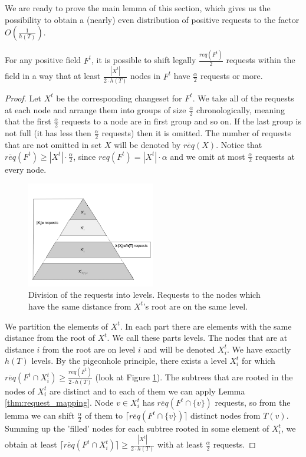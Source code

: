 We are ready to prove the main lemma of this
section, which gives us the possibility to obtain a (nearly) even distribution of
positive requests to the factor $O(\frac{1}{h(T)})$. 
\begin{lemma} For any positive field $F^t$, it is possible to shift legally $\frac{req(F^t)}{2}$
requests within the field in a way that at least $\frac{|X^t|}{2 \cdot h(T)}$ nodes in
$F^t$ have $\frac{\alpha}{2}$ requests or more.
\label{thm:legal_shifting_down}
\end{lemma}
\begin{proof}
Let $X^t$ be the corresponding changeset for $F^t$. We
take all of the requests at each node and arrange them into groups of size
$\frac{\alpha}{2}$ chronologically, meaning that the first $\frac{\alpha}{2}$
requests to a node are in first group and so on. If the last group is not full
(it has less then $\frac{\alpha}{2}$ requests) then it is omitted. The number
of requests that are not omitted in set $X$ will be denoted by
$\overline{req}(X)$. Notice that  $\overline{req}(F^t) \geq |X^t| \cdot
\frac{\alpha}{2}$, since $req(F^t) = |X^t| \cdot \alpha$ and we omit at most
$\frac{\alpha}{2}$ requests at every node.  \begin{figure} \begin{center}
\includegraphics[width=0.5\textwidth]{layers.png} \end{center} \caption{Division
of the requests into levels. Requests to the nodes which have the same distance
from $X^t$'s root are on the same level.} \label{fig:layers} \end{figure}

We partition the elements of $X^t$. In each part there are elements with the
same distance from the root of $X^t$. We call these parts levels. The nodes that
are at distance $i$ from the root are on level $i$ and will be denoted $X^t_i$.
We have exactly $h(T)$ levels. By the pigeonhole principle, there exists a level
$X^t_i$ for which $\overline{req}(F^t \cap X^t_i) \geq \frac{req(F^t)}{2 \cdot
h(T)}$ (look at Figure \ref{fig:layers}). The subtrees that are rooted in the nodes
of $X^t_i$ are distinct and to each of them we can apply Lemma
\ref{thm:request_mapping}. Node $v \in X^t_i$ has $\overline{req}(F^t \cap
\{v\})$ requests, so from the lemma we can shift $\frac{\alpha}{2}$ of them
to $\lceil \overline{req}(F^t \cap \{v\}) \rceil$ distinct nodes from $T(v)$.
Summing up the 'filled' nodes for each subtree rooted in some element of
$X^t_i$, we obtain at least $\lceil \overline{req}(F^t \cap X^t_i) \rceil \geq
\frac{|X^t|}{2 \cdot h(T)}$ with at least $\frac{\alpha}{2}$ requests.
\end{proof} 
